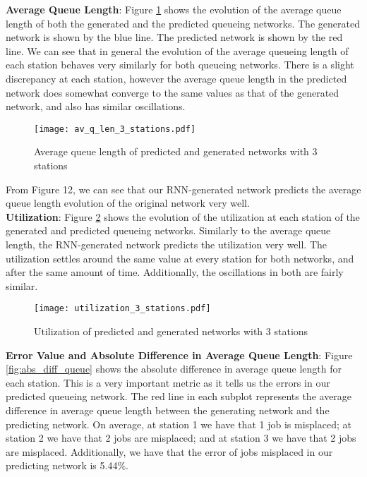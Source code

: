 \documentclass[a4paper,11pt,titlepage]{article}
\begin{document}
\textbf{Average Queue Length}: Figure \ref{fig:av_q_len_3_stations} shows the evolution of the average queue length of both the generated and the predicted queueing networks. The generated network is shown by the blue line. The predicted network is shown by the red line. We can see that in general the evolution of the average queueing length of each station behaves very similarly for both queueing networks. There is a slight discrepancy at each station, however the average queue length in the predicted network does somewhat converge to the same values as that of the generated network, and also has similar oscillations.

\begin{figure}[h!]
\begin{center}
\texttt{[image: av\_q\_len\_3\_stations.pdf]}
\caption{Average queue length of predicted and generated networks with 3 stations}
\label{fig:av_q_len_3_stations}
\end{center}
\end{figure}

From Figure 12, we can see that our RNN-generated network predicts the average queue length evolution of the original network very well. \\

\textbf{Utilization}: Figure \ref{fig:utilization_3_stations} shows the evolution of the utilization at each station of the generated and predicted queueing networks. Similarly to the average queue length, the RNN-generated network predicts the utilization very well. The utilization settles around the same value at every station for both networks, and after the same amount of time. Additionally, the oscillations in both are fairly similar. \\

\begin{figure}[h!]
\begin{center}
\texttt{[image: utilization\_3\_stations.pdf]}
\caption{Utilization of predicted and generated networks with 3 stations}
\label{fig:utilization_3_stations}
\end{center}
\end{figure}

\textbf{Error Value and Absolute Difference in Average Queue Length}: Figure \ref{fig:abs_diff_queue} shows the absolute difference in average queue length for each station. This is a very important metric as it tells us the errors in our predicted queueing network. The red line in each subplot represents the average difference in average queue length between the generating network and the predicting network. On average, at station 1 we have that 1 job is misplaced; at station 2 we have that 2 jobs are misplaced; and at station 3 we have that 2 jobs are misplaced. Additionally, we have that the error of jobs misplaced in our predicting network is 5.44\%. 
\end{document}
